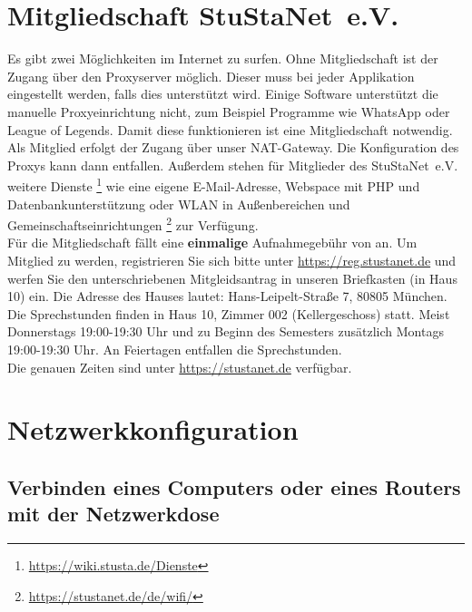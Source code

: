 \documentclass[a4paper,12pt]{scrartcl}
\begin{document}

\section*{Mitgliedschaft StuStaNet~e.V.}
Es gibt zwei Möglichkeiten im Internet zu surfen. Ohne Mitgliedschaft ist der Zugang über den Proxyserver möglich. Dieser muss bei jeder Applikation eingestellt werden, falls dies unterstützt wird. Einige Software unterstützt die manuelle Proxyeinrichtung nicht, zum Beispiel Programme wie WhatsApp oder League of Legends. Damit diese funktionieren ist eine Mitgliedschaft notwendig.
\pagebreak\linebreak
Als Mitglied erfolgt der Zugang über unser NAT-Gateway. Die Konfiguration des Proxys kann dann entfallen. Außerdem stehen für Mitglieder des StuStaNet~e.V. weitere Dienste \footnote{\url{https://wiki.stusta.de/Dienste}} wie eine eigene E-Mail-Adresse, Webspace mit PHP und Datenbankunterstützung oder WLAN in Außenbereichen und Gemeinschaftseinrichtungen \footnote{\url{https://stustanet.de/de/wifi/}} zur Verfügung. 
\\
Für die Mitgliedschaft fällt eine \textbf{einmalige} Aufnahmegebühr von  an. Um Mitglied zu werden, registrieren Sie sich bitte unter \mbox{\url{https://reg.stustanet.de}} und werfen Sie den unterschriebenen Mitgleidsantrag in unseren Briefkasten (in Haus 10) ein. Die Adresse des Hauses lautet: Hans-Leipelt-Straße 7, 80805 München.
\\
Die Sprechstunden finden in Haus 10, Zimmer 002 (Kellergeschoss) statt. Meist Donnerstags 19:00-19:30 Uhr und zu Beginn des Semesters zusätzlich Montags 19:00-19:30 Uhr. An Feiertagen entfallen die Sprechstunden.
\\
Die genauen Zeiten sind unter \mbox{\url{https://stustanet.de}} verfügbar.

\section*{Netzwerkkonfiguration}
\subsection*{Verbinden eines Computers oder eines Routers mit der Netzwerkdose}
\end{document}
